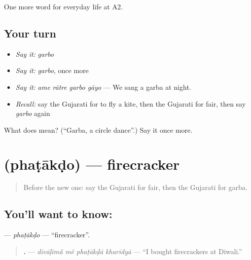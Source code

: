 \begin{grammarlens}[title={What you've built}]
One more word for everyday life at A2.
\end{grammarlens}

\subsection*{Your turn}
\begin{itemize}
\raggedright
  \item \emph{Say it:} \emph{garbo}
  \item \emph{Say it:} \emph{garbo}, once more
  \item \emph{Say it:} \emph{ame rātre garbo gāyo} — We sang a garba at night.
  \item \emph{Recall:} say the Gujarati for to fly a kite, then the Gujarati for fair, then say \emph{garbo} again
\end{itemize}

\begin{tcolorbox}[breakable,colback=teal!4,colframe=teal!35!black,title={Before you move on}]
What does  mean? (\textquotedblleft{}Garba, a circle dance\textquotedblright{}.) Say it once more.
\end{tcolorbox}
\section[\texorpdfstring{\gu{ફટાકડો} (phaṭākḍo)}{ફટાકડો (phaṭākḍo)}]{ (phaṭākḍo) — firecracker}

\label{lesson:GU-C261-phatakdo}



\begin{quote}
Before the new one: say the Gujarati for fair, then the Gujarati for garba.
\end{quote}

\subsection*{You'll want to know: }
\textbf{} — \emph{phaṭākḍo} — \textquotedblleft{}firecracker\textquotedblright{}.

\begin{quote}
\textbf{   .} — \emph{divāḷīmā̃ mẽ phaṭākḍā kharīdyā} — \textquotedblleft{}I bought firecrackers at Diwali.\textquotedblright{}
\end{quote}

